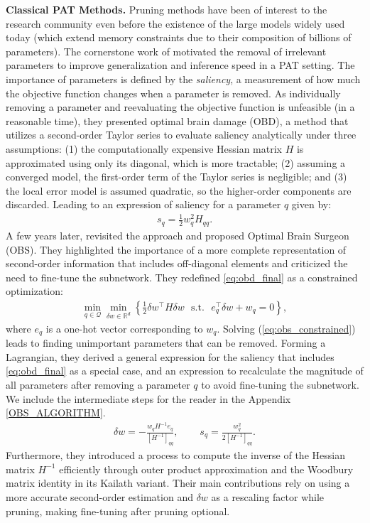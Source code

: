 \textbf{Classical PAT Methods.} Pruning methods have been of interest to the research community even before the existence of the large models widely used today (which extend memory constraints due to their composition of billions of parameters). The cornerstone work of \citet{lecun1989optimal} motivated the removal of irrelevant parameters to improve generalization and inference speed in a PAT setting. The importance of parameters is defined by the \textit{saliency}, a measurement of how much the objective function changes when a parameter is removed. As individually removing a parameter and reevaluating the objective function is unfeasible (in a reasonable time), they presented optimal brain damage (OBD), a method that utilizes a second-order Taylor series to evaluate saliency analytically under three assumptions: (1) the computationally expensive Hessian matrix $H$ is approximated using only its diagonal, which is more tractable; (2) assuming a converged model, the first-order term of the Taylor series is negligible; and (3) the local error model is assumed quadratic, so the higher-order components are discarded. Leading to an expression of saliency for a parameter $q$ given by:
\begin{align}   
    s_q = \frac{1}{2} w_q^2 H_{qq}.
    \label{eq:obd_final}
\end{align}
A few years later, \cite{hassibi1992second} revisited the approach and proposed Optimal Brain Surgeon (OBS). They highlighted the importance of a more complete representation of second-order information that includes off-diagonal elements and criticized the need to fine-tune the subnetwork. They redefined \eqref{eq:obd_final} as a constrained optimization:
\begin{align}   
    \min_{q\in \mathcal{Q}} \min_{\delta w \in \mathbb{R}^d} \left\{
    \frac{1}{2} \delta w^\top H \delta w ~~~\text{s.t.}~~~ e_q^\top \delta w + w_q = 0
    \right\},
    \label{eq:obs_constrained}
\end{align}
where $e_q$ is a one-hot vector corresponding to $w_q$. Solving (\ref{eq:obs_constrained}) leads to finding unimportant parameters that can be removed. Forming a Lagrangian, they derived a general expression for the saliency that includes \eqref{eq:obd_final} as a special case, and an expression to recalculate the magnitude of all parameters after removing a parameter $q$ to avoid fine-tuning the subnetwork. We include the intermediate steps for the reader in the Appendix \ref{OBS_ALGORITHM}.
\begin{align}
    \delta w = -\frac{w_q H^{-1} e_q}{[H^{-1}]_{qq}},
    ~~~&~~~
    s_q = \frac{w_q^2}{2[H^{-1}]_{qq}}.
    \label{eq:obs_final}
\end{align}
Furthermore, they introduced a process to compute the inverse of the Hessian matrix $H^{-1}$ efficiently through outer product approximation and the Woodbury matrix identity in its Kailath variant. Their main contributions rely on using a more accurate second-order estimation and $\delta w$ as a rescaling factor while pruning, making fine-tuning after pruning optional.


